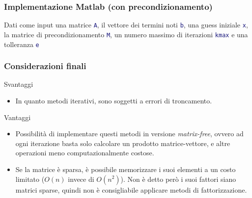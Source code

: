 \documentclass[10pt]{beamer}
\begin{document}
\begin{frame}\frametitle{Implementazione Matlab (con precondizionamento)}
Dati come input
una matrice \lstinline[language=Matlab]{A}, 
il vettore dei termini noti \lstinline[language=Matlab]{b},
una guess iniziale \lstinline[language=Matlab]{x},
la matrice di precondizionamento \lstinline[language=Matlab]{M},
un numero massimo di iterazioni \lstinline[language=Matlab]{kmax}
e una tolleranza \lstinline[language=Matlab]{e}

\end{frame}

\begin{frame}
\frametitle{Considerazioni finali}
    Svantaggi
    \begin{itemize}
        \item In quanto metodi iterativi, sono soggetti a errori di troncamento. %
    \end{itemize}
    Vantaggi
    \begin{itemize}
        \item Possibilità di implementare questi metodi in versione \textit{matrix-free}, ovvero ad ogni iterazione basta solo calcolare un prodotto matrice-vettore, e altre operazioni meno computazionalmente costose. %
        \item Se la matrice è \alert{sparsa}, è possibile memorizzare i suoi elementi a un costo limitato ($O(n)$ invece di $O(n^2)$). Non è detto però i suoi fattori siano matrici sparse, quindi non è consigliabile applicare metodi di fattorizzazione.
        
    \end{itemize}
\end{frame}
\end{document}
